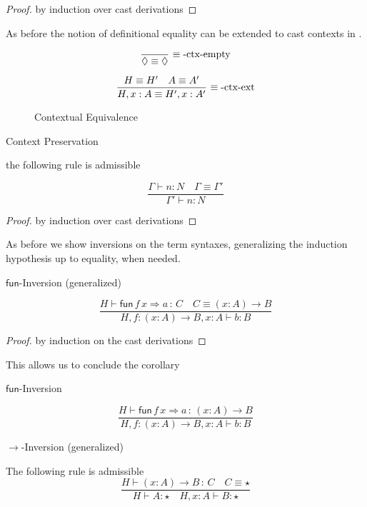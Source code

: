 \begin{proof}
by induction over cast derivations
\end{proof}
As before the notion of definitional equality can be extended to cast contexts in .

\begin{figure}
\[
\frac{\ }{\lozenge\equiv\lozenge}\,\rulename{\ensuremath{\equiv}-ctx-empty}
\]

\[
\frac{H\equiv H'\quad A\equiv A'}{H,x:A\equiv H',x:A'}\,\operatorname{\equiv-ctx-ext}
\]
\caption{Contextual Equivalence}
\label{fig:cast-Context-Equiv}
\end{figure}

\begin{lem}
Context Preservation

the following rule is admissible

\[
\frac{\Gamma\vdash n:N\quad\Gamma\equiv\Gamma'}{\Gamma'\vdash n:N}
\]
\end{lem}

\begin{proof}
by induction over cast derivations
\end{proof}
As before we show inversions on the term syntaxes, generalizing the induction hypothesis up to equality, when needed.
\begin{lem}
$\mathsf{fun}$-Inversion (generalized)

\[
\frac{H\vdash\mathsf{fun}\,f\,x\Rightarrow a\,:\,C\quad C\equiv\left(x:A\right)\rightarrow B}{H,f:\left(x:A\right)\rightarrow B,x:A\vdash b:B}
\]
\end{lem}

\begin{proof}
by induction on the cast derivations
\end{proof}

This allows us to conclude the corollary 
\begin{cor}
$\mathsf{fun}$-Inversion 

\[
\frac{H\vdash\mathsf{fun}\,f\,x\Rightarrow a\,:\,\left(x:A\right)\rightarrow B}{H,f:\left(x:A\right)\rightarrow B,x:A\vdash b:B}
\]
\end{cor}

\begin{lem}
$\rightarrow$-Inversion (generalized)

The following rule is admissible
\[
\frac{H\vdash\left(x:A\right)\rightarrow B\,:\,C\quad C\equiv\star}{H\vdash A:\star\quad H,x:A\vdash B:\star}
\]
\end{lem}

